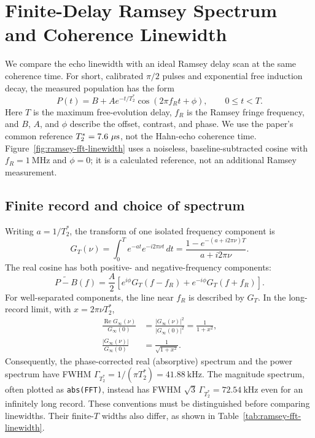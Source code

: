 \section{Finite-Delay Ramsey Spectrum and Coherence Linewidth}
\label{sec:ramsey-fft-linewidth}

We compare the echo linewidth with an ideal Ramsey delay scan at the same
coherence time. For short, calibrated $\pi/2$ pulses and exponential free
induction decay, the measured population has the form~\cite{PhysRev.78.695}
\begin{equation}
 P(t)=B+A e^{-t/T_2^*}\cos(2\pi f_Rt+\phi),\qquad 0\leq t<T.
 \label{eq:ramsey-decaying-cosine}
\end{equation}
Here $T$ is the maximum free-evolution delay, $f_R$ is the Ramsey fringe
frequency, and $B$, $A$, and $\phi$ describe the offset, contrast, and phase.
We use the paper's common reference $T_2^*=7.6~\mu\mathrm{s}$,
not the Hahn-echo coherence time. Figure~\ref{fig:ramsey-fft-linewidth}
uses a noiseless, baseline-subtracted cosine with $f_R=1~\mathrm{MHz}$ and
$\phi=0$; it is a calculated reference, not an additional Ramsey measurement.

\subsection{Finite record and choice of spectrum}

Writing $a=1/T_2^*$, the transform of one isolated frequency component is
\begin{equation}
 G_T(\nu)=\int_0^T e^{-at}e^{-i2\pi\nu t}\,dt
 =\frac{1-e^{-(a+i2\pi\nu)T}}{a+i2\pi\nu}.
 \label{eq:ramsey-finite-transform}
\end{equation}
The real cosine has both positive- and negative-frequency components:
\begin{equation}
 \widetilde{P-B}(f)=\frac{A}{2}
 \left[e^{i\phi}G_T(f-f_R)+e^{-i\phi}G_T(f+f_R)\right].
 \label{eq:ramsey-cosine-transform}
\end{equation}
For well-separated components, the line near $f_R$ is described by $G_T$.
In the long-record limit, with $x=2\pi\nu T_2^*$,
\begin{align}
 \frac{\operatorname{Re}G_\infty(\nu)}{G_\infty(0)}
 &=\frac{|G_\infty(\nu)|^2}{|G_\infty(0)|^2}
 =\frac{1}{1+x^2},\\
 \frac{|G_\infty(\nu)|}{G_\infty(0)}&=\frac{1}{\sqrt{1+x^2}}.
\end{align}
Consequently, the phase-corrected real (absorptive) spectrum and the power
spectrum have FWHM $\Gamma_{T_2^*}=1/(\pi T_2^*)=41.88~\mathrm{kHz}$.
The magnitude spectrum, often plotted as \texttt{abs(FFT)}, instead has
FWHM $\sqrt{3}\,\Gamma_{T_2^*}=72.54~\mathrm{kHz}$ even for an infinitely
long record. These conventions must be distinguished before comparing
linewidths. Their finite-$T$ widths also differ, as shown in
Table~\ref{tab:ramsey-fft-linewidth}.

